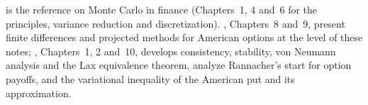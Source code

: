 
\furtherreading
\textcite{glasserman-monte-carlo} is the reference on Monte Carlo in finance (Chapters~1, 4 and~6
for the principles, variance reduction and discretization). \textcite{wilmott-howison-dewynne},
Chapters~8 and~9, present finite differences and projected methods for American options at the
level of these notes; \textcite{strikwerda-finite-difference}, Chapters~1, 2 and~10, develops
consistency, stability, von Neumann analysis and the Lax equivalence theorem.
\textcite{giles-carter-2006} analyze Rannacher's start for option payoffs, and
\textcite{jaillet-lamberton-lapeyre-1990} the variational inequality of the American put and its
approximation.
